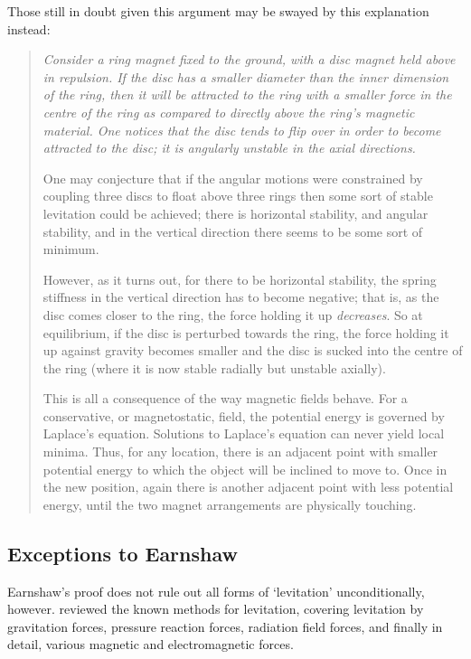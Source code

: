 Those still in doubt given this argument may be swayed by this explanation
instead: 
\begin{quotation}\em
Consider a ring magnet fixed to the ground, with a disc magnet held above in
repulsion. If the disc has a smaller diameter than the inner dimension of the
ring, then it will be attracted to the ring with a smaller force in the centre
of the ring as compared to directly above the ring's magnetic material. One
notices that the disc tends to flip over in order to become attracted to the
disc; it is angularly unstable in the axial directions.

One may conjecture that if the angular motions were constrained by coupling
three discs to float above three rings then some sort of stable levitation
could be achieved; there is horizontal stability, and angular stability, and
in the vertical direction there seems to be some sort of minimum.

However, as it turns out, for there to be horizontal stability, the spring
stiffness in the vertical direction has to become negative; that is, as the
disc comes closer to the ring, the force holding it up \emph{decreases}. So at
equilibrium, if the disc is perturbed towards the ring, the force holding it
up against gravity becomes smaller and the disc is sucked into the centre of
the ring (where it is now stable radially but unstable axially).

This is all a consequence of the way magnetic fields behave. For a
conservative, or magnetostatic, field, the potential energy is governed by
Laplace's equation. Solutions to Laplace's equation can never yield local
minima. Thus, for any location, there is an adjacent point with smaller
potential energy to which the object will be inclined to move to. Once in the
new position, again there is another adjacent point with less potential
energy, until the two magnet arrangements are physically touching.
\end{quotation}



\subsection{Exceptions to Earnshaw}

Earnshaw's proof does not rule out all forms of `levitation' unconditionally,
however. \textcite{boerdijk1956a} reviewed the known methods for levitation,
covering levitation by gravitation forces, pressure reaction forces, radiation
field forces, and finally in detail, various magnetic and electromagnetic
forces.

